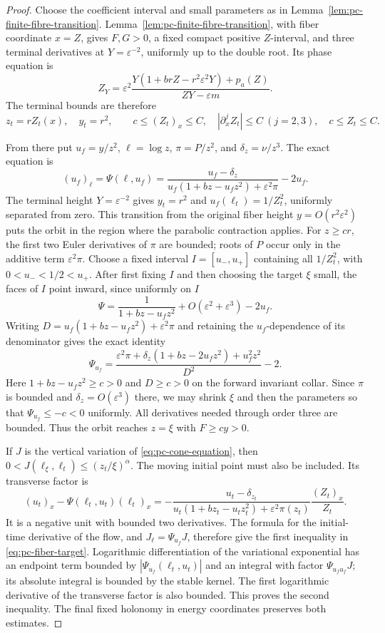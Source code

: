 \begin{proof}
Choose the coefficient interval and small parameters as in
Lemma~\ref{lem:pc-finite-fibre-transition}.
Lemma~\ref{lem:pc-finite-fibre-transition}, with fiber coordinate
$x=Z$, gives $F,G>0$, a fixed compact positive $Z$-interval, and three
terminal derivatives at $Y=\varepsilon^{-2}$, uniformly up to the
double root. Its phase equation is
\[
 Z_Y=\varepsilon^2\frac{Y(1+brZ-r^2\varepsilon^2Y)+p_a(Z)}
                              {ZY-\varepsilon m}.
\]
The terminal bounds are therefore
\[
 z_t=rZ_t(x),\quad y_t=r^2,\qquad
 c\le (Z_t)_x\le C,\quad
 |\partial_x^jZ_t|\le C\ (j=2,3),\quad c\le Z_t\le C.
\]

From there put $u_f=y/z^2$, $\ell=\log z$,
$\pi=P/z^2$, and $\delta_z=\nu/z^3$. The exact equation is
\begin{equation}
\label{eq:pc-cone-equation}
 (u_f)_\ell=\Psi(\ell,u_f)
   =\frac{u_f-\delta_z}
            {u_f(1+bz-u_fz^2)+\varepsilon^2\pi}-2u_f.
\end{equation}
The terminal height $Y=\varepsilon^{-2}$ gives $y_t=r^2$ and
$u_f(\ell_t)=1/Z_t^2$, uniformly separated from zero. This transition
from the original fiber height $y=O(r^2\varepsilon^2)$ puts the orbit
in the region where the parabolic contraction applies. For $z\ge cr$,
the first two Euler derivatives of $\pi$ are bounded; roots of $P$ occur only in
the additive term $\varepsilon^2\pi$. Choose a fixed interval
$I=[u_-,u_+]$ containing all $1/Z_t^2$, with
$0<u_-<1/2<u_+$. After first fixing $I$ and then choosing the target
$\xi$ small, the faces of $I$ point inward, since uniformly on $I$
\[
 \Psi=\frac1{1+bz-u_fz^2}+O(\varepsilon^2+\varepsilon^3)-2u_f.
\]
Writing $D=u_f(1+bz-u_fz^2)+\varepsilon^2\pi$ and retaining the
$u_f$-dependence of its denominator gives the exact identity
\[
 \Psi_{u_f}
 =\frac{\varepsilon^2\pi+\delta_z(1+bz-2u_fz^2)
       +u_f^2z^2}{D^2}-2.
\]
Here $1+bz-u_fz^2\ge c>0$ and $D\ge c>0$ on the forward invariant
collar. Since $\pi$ is bounded and $\delta_z=O(\varepsilon^3)$ there,
we may shrink $\xi$ and then the parameters so that
$\Psi_{u_f}\le-c<0$ uniformly. All derivatives needed through order
three are bounded. Thus the orbit reaches $z=\xi$ with $F\ge c y>0$.

If $J$ is the vertical variation of \eqref{eq:pc-cone-equation}, then
$0<J(\ell_\xi,\ell_t)\le(z_t/\xi)^\alpha$.
The moving initial point must also be included. Its transverse factor is
\[
 (u_t)_x-\Psi(\ell_t,u_t)(\ell_t)_x
 =-\frac{u_t-\delta_{z_t}}
              {u_t(1+bz_t-u_tz_t^2)+\varepsilon^2\pi(z_t)}
                                  \frac{(Z_t)_x}{Z_t}.
\]
It is a negative unit with bounded two derivatives. The formula for
the initial-time derivative of the flow, and
$J_\ell=\Psi_{u_f}J$, therefore give the first inequality in
\eqref{eq:pc-fiber-target}. Logarithmic differentiation of the
variational exponential has an endpoint term bounded by
$|\Psi_{u_f}(\ell_t,u_t)|$ and an integral with factor
$\Psi_{u_fu_f}J$; its absolute integral is bounded by the stable
kernel. The first logarithmic derivative of the transverse factor is
also bounded. This proves the second inequality. The final fixed
holonomy in energy coordinates preserves both estimates.
\end{proof}

